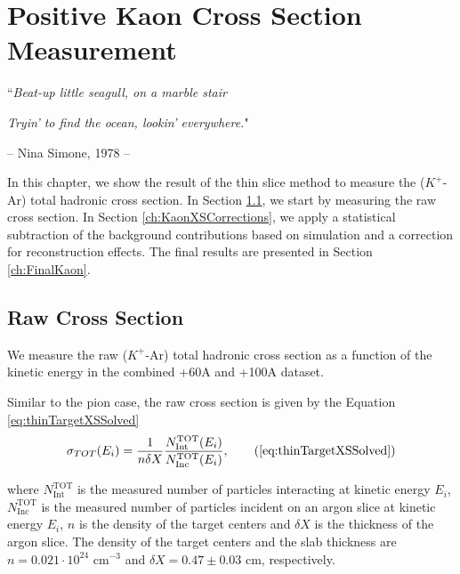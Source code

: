 \chapter{Positive Kaon Cross Section Measurement}\label{ch:KaonXS}
{\raggedleft ``\emph{Beat-up little seagull, on a marble stair} \par}
{\raggedleft \emph{Tryin' to find the ocean, lookin' everywhere.}"\par}
{\raggedleft -- Nina Simone, 1978 -- \par}%
\vspace{0.5cm}

In this chapter, we show the result of the thin slice method to measure  the ($K^+$-Ar) total hadronic cross section. In Section \ref{ch:KaonXSRaw}, we start by measuring the raw cross section. In Section \ref{ch:KaonXSCorrections}, we apply a statistical subtraction of the background contributions based on simulation and a correction for reconstruction effects. The final results are presented in Section \ref{ch:FinalKaon}.


\section{Raw Cross Section}\label{ch:KaonXSRaw}
We measure the raw ($K^+$-Ar) total hadronic cross section as a function of the kinetic energy in the combined +60A and +100A dataset. 

Similar to the pion case,  the raw cross section is given by the Equation \ref{eq:thinTargetXSSolved}
\begin{equation}
 \sigma_{TOT} (E_i)  = \frac{1}{n \delta X}\frac{N^{\text{TOT}}_{\text{Int}}(E_i)}{N^{\text{TOT}}_{\text{Inc}}(E_i)}, \tag{\ref{eq:thinTargetXSSolved}}
\end{equation}

where $N^{\text{TOT}}_{\text{Int}}$  is the measured number of particles interacting at kinetic energy $E_i$, $N^{\text{TOT}}_{\text{Inc}}$ is the  measured  number of particles incident  on an argon slice at  kinetic energy $E_i$,  $n$ is the density of the target centers  and $\delta X$ is the thickness of the argon slice. The density of the target centers and the slab thickness are $n = 0.021\cdot10^{24} \text{ cm}^{-3} $ and  $\delta X=0.47 \pm 0.03\text{ cm}$, respectively.


